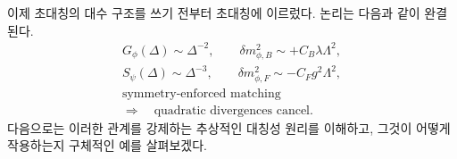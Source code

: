 이제 초대칭의 대수 구조를 쓰기 전부터 초대칭에 이르렀다. 논리는 다음과 같이 완결된다.
\begin{equation}
\begin{gathered}
G_\phi(\Delta)\sim \Delta^{-2},
\qquad
\delta m_{\phi,B}^2\sim+C_B\lambda\Lambda^2,\\[0.4em]
S_\psi(\Delta)\sim \Delta^{-3},
\qquad
\delta m_{\phi,F}^2\sim-C_Fg^2\Lambda^2,\\[0.4em]
\text{symmetry-enforced matching}\\
\Longrightarrow\quad
\text{quadratic divergences cancel}.
\end{gathered}
\end{equation}
다음으로는 이러한 관계를 강제하는 추상적인 대칭성 원리를 이해하고, 그것이 어떻게 작용하는지 구체적인 예를 살펴보겠다.
